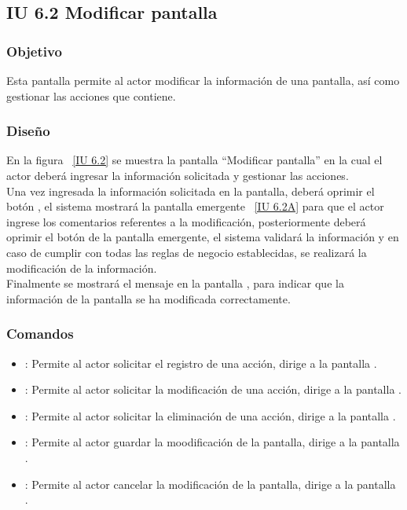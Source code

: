 \newpage 
\subsection{IU 6.2 Modificar pantalla}

\subsubsection{Objetivo}
	
	Esta pantalla permite al actor modificar la información de una pantalla, así como gestionar las acciones que contiene.

\subsubsection{Diseño}

    En la figura ~\ref{IU 6.2} se muestra la pantalla ``Modificar pantalla'' en la cual el actor deberá ingresar la información solicitada y gestionar las acciones. \\
    
    Una vez ingresada la información solicitada en la pantalla, deberá oprimir el botón , el sistema mostrará la pantalla emergente ~\ref{IU 6.2A} 
    para que el actor ingrese los comentarios referentes a la modificación, posteriormente deberá oprimir el botón  de la pantalla emergente,
    el sistema validará la información y en caso de cumplir con todas las reglas de negocio establecidas, se realizará la modificación de la información.\\
    
    Finalmente se mostrará el mensaje  en la pantalla , para indicar que la información de la pantalla se ha modificada correctamente.        



\subsubsection{Comandos}
\begin{itemize}
	\item {}: Permite al actor solicitar el registro de una acción, dirige a la pantalla .
	\item \btnEditar[Modificar]: Permite al actor solicitar la modificación de una acción, dirige a la pantalla .
	\item \btnEliminar[Eliminar]: Permite al actor solicitar la eliminación de una acción, dirige a la pantalla .
	\item {}: Permite al actor guardar la moodificación de la pantalla, dirige a la pantalla .
	\item {}: Permite al actor cancelar la modificación de la pantalla, dirige a la pantalla .
\end{itemize}

